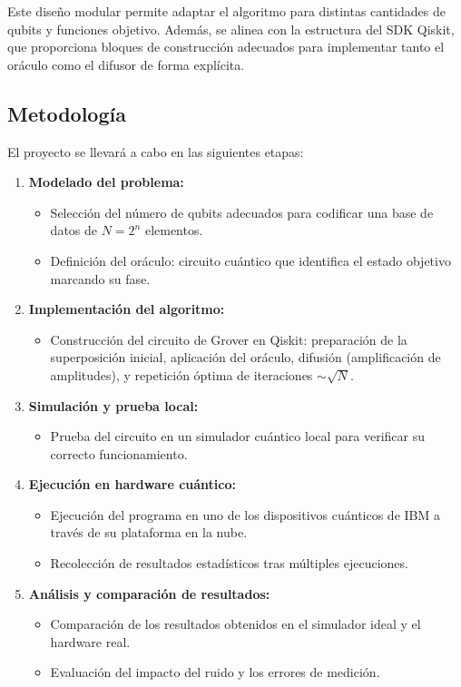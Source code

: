 \documentclass{article}
\begin{document}
Este diseño modular permite adaptar el algoritmo para distintas cantidades de qubits y funciones objetivo. Además, se alinea con la estructura del SDK Qiskit, que proporciona bloques de construcción adecuados para implementar tanto el oráculo como el difusor de forma explícita.

\subsection{Metodología}

El proyecto se llevará a cabo en las siguientes etapas:

\begin{enumerate}
    \item \textbf{Modelado del problema:}
    \begin{itemize}
        \item Selección del número de qubits adecuados para codificar una base de datos de $N = 2^n$ elementos.
        \item Definición del oráculo: circuito cuántico que identifica el estado objetivo marcando su fase.
    \end{itemize}
    
    \item \textbf{Implementación del algoritmo:}
    \begin{itemize}
        \item Construcción del circuito de Grover en Qiskit: preparación de la superposición inicial, aplicación del oráculo, difusión (amplificación de amplitudes), y repetición óptima de iteraciones $\sim \sqrt{N}$.
    \end{itemize}
    
    \item \textbf{Simulación y prueba local:}
    \begin{itemize}
        \item Prueba del circuito en un simulador cuántico local para verificar su correcto funcionamiento.
    \end{itemize}
    
    \item \textbf{Ejecución en hardware cuántico:}
    \begin{itemize}
        \item Ejecución del programa en uno de los dispositivos cuánticos de IBM a través de su plataforma en la nube.
        \item Recolección de resultados estadísticos tras múltiples ejecuciones.
    \end{itemize}
    
    \item \textbf{Análisis y comparación de resultados:}
    \begin{itemize}
        \item Comparación de los resultados obtenidos en el simulador ideal y el hardware real.
        \item Evaluación del impacto del ruido y los errores de medición.
    \end{itemize}
\end{enumerate}
\end{document}
